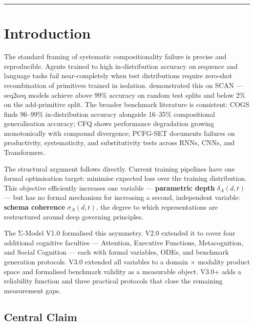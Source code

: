 \documentclass[11pt,a4paper]{article}
\begin{document}
\bigskip
\noindent\rule{\linewidth}{0.4pt}

\section{Introduction}\label{sec:introduction}

The standard framing of systematic compositionality failure is precise
and reproducible. Agents trained to high in-distribution accuracy on
sequence and language tasks fail near-completely when test distributions
require zero-shot recombination of primitives trained in isolation.
\cite{lake2018generalizationwithoutsystematicity} demonstrated this on
SCAN --- seq2seq models achieve above 99\% accuracy on random test splits
and below 2\% on the add-primitive split. The broader benchmark
literature is consistent: COGS \citep{kim2020cogscompositionalgeneralizationchallenge}
finds 96--99\% in-distribution accuracy alongside 16--35\% compositional
generalisation accuracy; CFQ \citep{keysers2020measuringcompositionalgeneralizationcomprehensive}
shows performance degradation growing monotonically with compound
divergence; PCFG-SET \citep{hupkes2020compositionalitydecomposed} documents
failures on productivity, systematicity, and substitutivity tests across
RNNs, CNNs, and Transformers.

The structural argument follows directly. Current training pipelines have
one formal optimisation target: minimise expected loss over the training
distribution. This objective efficiently increases one variable ---
\textbf{parametric depth} $\delta_A(d,t)$ --- but has no formal
mechanism for increasing a second, independent variable: \textbf{schema
coherence} $\sigma_A(d,t)$, the degree to which representations are
restructured around deep governing principles.

The Σ-Model V1.0 formalised this asymmetry. V2.0 extended it to
cover four additional cognitive faculties --- Attention, Executive
Functions, Metacognition, and Social Cognition --- each with formal
variables, ODEs, and benchmark generation protocols. V3.0 extended all
variables to a domain $\times$ modality product space and formalised
benchmark validity as a measurable object. V3.0+ adds a reliability
function and three practical protocols that close the remaining
measurement gaps.

\subsection{Central Claim}\label{sec:central-claim}
\end{document}
